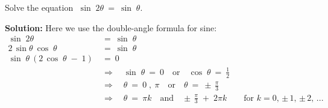\begin{exmp}
 Solve the equation $\;\sin\;2\theta ~=~ \sin\;\theta$.\vspace{1mm}
 \par\noindent\textbf{Solution:} Here we use the double-angle formula for sine:
 \begin{align*}
  \sin\;2\theta ~&=~ \sin\;\theta\\
  2\,\sin\theta~\cos\;\theta ~&=~ \sin\;\theta\\
  \sin\;\theta~(2\,\cos\;\theta \;-\; 1) ~&=~ 0\\
  &\Rightarrow\quad \sin\;\theta ~=~ 0 \quad\text{or}\quad \cos\;\theta ~=~ \frac{1}{2}\\
  &\Rightarrow\quad \theta ~=~ 0\;,~\pi \quad\text{or}\quad \theta ~=~ \pm\,\frac{\pi}{3}\\
  &\Rightarrow\quad \boxed{\theta ~=~ \pi k \quad\text{and}\quad \pm\,\frac{\pi}{3} \;+\; 2\pi k}
  \qquad\text{for $k=0$, $\pm\,1$, $\pm\,2$, $...$}
 \end{align*}
\end{exmp}
\divider
\newpage
